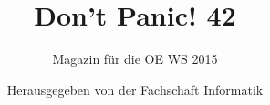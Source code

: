 \begin{titlepage}

\thispagestyle{empty}
\title{\Huge{Don't Panic! 42}}
\author{Magazin für die OE WS 2015}
\date{Herausgegeben von der Fachschaft Informatik}


%

\maketitle
\newpage
\end{titlepage}

